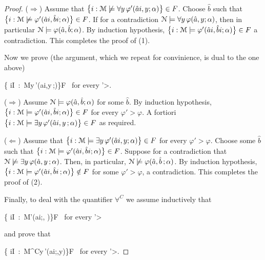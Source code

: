 \documentclass[12pt,letterpaper,oneside,reqno]{amsart}
\theoremstyle{plain}
\theoremstyle{remark}
\begin{document}
\begin{proof}
  ($\Rightarrow$) Assume that $\big\{ i:{\EuScript M}\not\models\forall y\,\varphi'(\hat ai,y;\alpha)\big\}\in F$.
  Choose $\hat b$ such that $\big\{ i:{\EuScript M}\not\models\varphi'(\hat ai,\hat bi;\alpha)\big\}\in F$.
  If for a contradiction ${\EuScript N}\models\forall y\,\varphi(\hat a,y; \alpha)$, 
  then in particular ${\EuScript N}\models\varphi(\hat a,\hat b; \alpha)$.
  By induction hypothesis, $\big\{ i:{\EuScript M}\models\varphi'(\hat ai,\hat bi;\alpha)\big\}\in F$ a contradiction. This completes the proof of (1).
  
  Now we prove (the argument, which we repeat for convinience, is dual to the one above)

  {\Leftrightarrow}
  {\big\{ i\in I\ :\ {\EuScript M}\models\exists y\,\varphi'(\hat ai,y\,;\alpha)\big\}\in F \ \textrm{for every }\varphi'>\varphi.}

  ($\Rightarrow$) Assume ${\EuScript N}\models\varphi(\hat a,\hat b; \alpha)$ for some $\hat b$.
  By induction hypothesis, $\big\{ i: {\EuScript M}\models\varphi'(\hat ai,\hat bi;\alpha)\big\}\in F$ for every $\varphi'>\varphi$.
  A fortiori $\big\{ i:{\EuScript M}\models\exists y\,\varphi'(\hat ai,y\,;\alpha)\big\}\in F$ as required.

  ($\Leftarrow$) Assume that $\big\{ i:{\EuScript M}\models\exists y\,\varphi'(\hat ai,y;\alpha)\big\}\in F$ for every $\varphi'>\varphi$.
  Choose some $\hat b$ such that $\big\{ i:{\EuScript M}\models\varphi'(\hat ai,\hat bi;\alpha)\big\}\in F$.
  Suppose for a contradiction that ${\EuScript N}\not\models\exists y\,\varphi(\hat a,y\,; \alpha)$.
  Then, in particular, ${\EuScript N}\not\models\varphi(\hat a,\hat b\,; \alpha)$.
  By induction hypothesis, $\big\{ i:{\EuScript M}\models\varphi'(\hat ai,\hat bi\,;\alpha)\big\}\notin F$ for some $\varphi'>\varphi$, a contradiction. This completes the proof of (2).
  
  Finally, to deal with the quantifier $\forall^C$ we assume inductively that 
 
  {\Leftrightarrow}
  {\big\{ i\in I\ :\ {\EuScript M}\models\varphi'(\hat ai;\alpha, \beta)\big\}\in F \ \textrm{for every }\varphi'>\varphi}
  
  and prove that
 
  {\Leftrightarrow}
  {\big\{ i\in I\ :\ {\EuScript M}\models\forall^C\!y\,\varphi'(\hat ai;\alpha,y)\big\}\in F \ \textrm{for every }\varphi'>\varphi.}
  

\end{proof}
\end{document}
